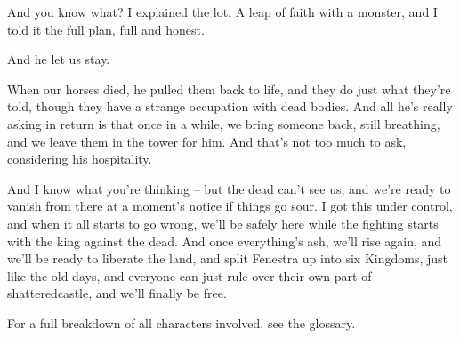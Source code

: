 \begin{speechtext}
	And you know what?  I explained the lot.  A leap of faith with a monster, and I told it the full plan, full and honest.

	And he let us stay.

	When our horses died, he pulled them back to life, and they do just what they're told, though they have a strange occupation with dead bodies.  And all he's really asking in return is that once in a while, we bring someone back, still breathing, and we leave them in the tower for him.  And that's not too much to ask, considering his hospitality.

	And I know what you're thinking -- but the dead can't see us, and we're ready to vanish from there at a moment's notice if things go sour.  I got this under control, and when it all starts to go wrong, we'll be safely here while the fighting starts with the king against the dead.  And once everything's ash, we'll rise again, and we'll be ready to liberate the land, and split Fenestra up into six Kingdoms, just like the old days, and everyone can just rule over their own part of \gls{shatteredcastle}, and we'll finally be free.

\end{speechtext}

For a full breakdown of all characters involved, see the glossary.

